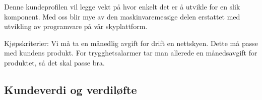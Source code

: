 Denne kundeprofilen vil legge vekt på hvor enkelt det er å utvikle for en slik
komponent. Med oss blir mye av den maskinvaremessige delen erstattet med
utvikling av programvare på vår skyplattform.

Kjøpskriterier: Vi må ta en månedlig avgift for drift en nettskyen. Dette må
passe med kundens produkt. For trygghetsalarmer tar man allerede en
månedsavgift for produktet, så det skal passe bra.




\subsection{Kundeverdi og verdiløfte}





